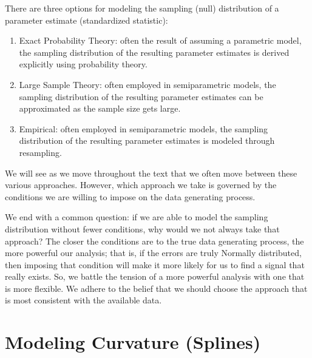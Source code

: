 \documentclass[
  letterpaper,
  DIV=11,
  numbers=noendperiod]{scrreprt}
\providecommand{\tightlist}{%
  \setlength{\itemsep}{0pt}\setlength{\parskip}{0pt}}\usepackage{longtable,booktabs,array}
\theoremstyle{definition}
\theoremstyle{definition}
\theoremstyle{remark}
\begin{document}
\begin{tcolorbox}[enhanced jigsaw, bottomrule=.15mm, titlerule=0mm, bottomtitle=1mm, colback=white, coltitle=black, rightrule=.15mm, leftrule=.75mm, toprule=.15mm, toptitle=1mm, left=2mm, opacityback=0, colframe=quarto-callout-tip-color-frame, breakable, title=\textcolor{quarto-callout-tip-color}{\faLightbulb}\hspace{0.5em}{Big Idea}, arc=.35mm, colbacktitle=quarto-callout-tip-color!10!white, opacitybacktitle=0.6]

There are three options for modeling the sampling (null) distribution of
a parameter estimate (standardized statistic):

\begin{enumerate}
\def\labelenumi{\arabic{enumi}.}
\tightlist
\item
  Exact Probability Theory: often the result of assuming a parametric
  model, the sampling distribution of the resulting parameter estimates
  is derived explicitly using probability theory.
\item
  Large Sample Theory: often employed in semiparametric models, the
  sampling distribution of the resulting parameter estimates can be
  approximated as the sample size gets large.
\item
  Empirical: often employed in semiparametric models, the sampling
  distribution of the resulting parameter estimates is modeled through
  resampling.
\end{enumerate}

\end{tcolorbox}

We will see as we move throughout the text that we often move between
these various approaches. However, which approach we take is governed by
the conditions we are willing to impose on the data generating process.

We end with a common question: if we are able to model the sampling
distribution without fewer conditions, why would we not always take that
approach? The closer the conditions are to the true data generating
process, the more powerful our analysis; that is, if the errors are
truly Normally distributed, then imposing that condition will make it
more likely for us to find a signal that really exists. So, we battle
the tension of a more powerful analysis with one that is more flexible.
We adhere to the belief that we should choose the approach that is most
consistent with the available data.

\hypertarget{sec-modeling-splines}{%
\chapter{Modeling Curvature (Splines)}\label{sec-modeling-splines}}
\end{document}
